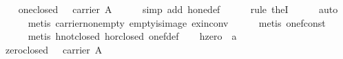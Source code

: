 \begin{isabellebody}
\endisatagproof
{\isafoldproof}%
%
\isadelimproof
\isanewline
%
\endisadelimproof
\isanewline
\ \ \isamarkupfalse%
\ one{}closed{}\ {}{}\ {}\ carrier\ A{}\isanewline
%
\isadelimproof
\ \ \ \ %
\endisadelimproof
%
\isatagproof
{}\isamarkupfalse%
\ {}simp\ add{}\ hone{}def{}\isanewline
\ \ \ \ \isamarkupfalse%
\ {}rule\ the{}I{}{}\isanewline
\ \ \ \ \isamarkupfalse%
\ auto\isanewline
\ \ \ \ \isamarkupfalse%
\ {}metis\ carrier{}non{}empty\ empty{}is{}image\ ex{}in{}conv{}\isanewline
\ \ \ \ \isamarkupfalse%
\ {}metis\ one{}f{}const{}\isanewline
\ \ \ \ \isamarkupfalse%
\ {}metis\ hnot{}closed\ hor{}closed\ one{}f{}def{}%
\endisatagproof
{\isafoldproof}%
%
\isadelimproof
\isanewline
%
\endisadelimproof
\isanewline
\ \ \isamarkupfalse%
\ hzero\ {}{}\ {}{}a{}\ {}{}{}{}{}\ \isanewline
\ \ \ \ {}{}\ {}\ {}{}{}\isanewline
\isanewline
\ \ \isamarkupfalse%
\ zero{}closed{}\ {}{}\ {}\ carrier\ A{}\isanewline

\end{isabellebody}
